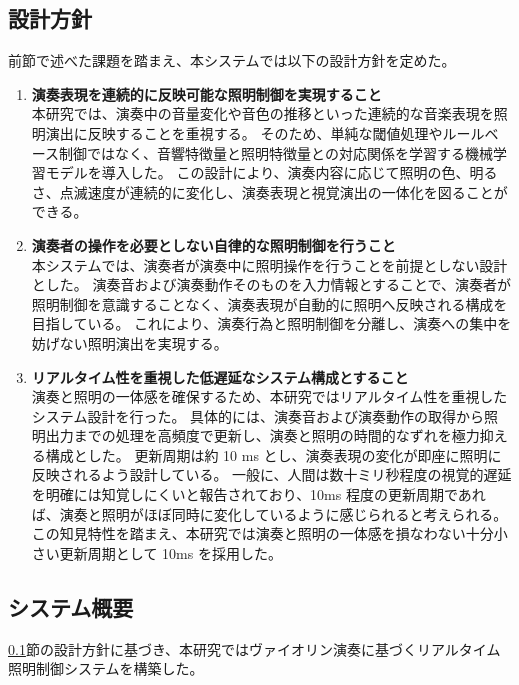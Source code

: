 \subsection{設計方針} \label{sec:design-policy}

前節で述べた課題を踏まえ、本システムでは以下の設計方針を定めた。

\begin{enumerate}
	\item \textbf{演奏表現を連続的に反映可能な照明制御を実現すること}　\\
	    本研究では、演奏中の音量変化や音色の推移といった連続的な音楽表現を照明演出に反映することを重視する。
		そのため、単純な閾値処理やルールベース制御ではなく、音響特徴量と照明特徴量との対応関係を学習する機械学習モデルを導入した。
		この設計により、演奏内容に応じて照明の色、明るさ、点滅速度が連続的に変化し、演奏表現と視覚演出の一体化を図ることができる。
	\item \textbf{演奏者の操作を必要としない自律的な照明制御を行うこと}　\\
	    本システムでは、演奏者が演奏中に照明操作を行うことを前提としない設計とした。
		演奏音および演奏動作そのものを入力情報とすることで、演奏者が照明制御を意識することなく、演奏表現が自動的に照明へ反映される構成を目指している。
		これにより、演奏行為と照明制御を分離し、演奏への集中を妨げない照明演出を実現する。
	\item \textbf{リアルタイム性を重視した低遅延なシステム構成とすること}　\\
	    演奏と照明の一体感を確保するため、本研究ではリアルタイム性を重視したシステム設計を行った。
		具体的には、演奏音および演奏動作の取得から照明出力までの処理を高頻度で更新し、演奏と照明の時間的なずれを極力抑える構成とした。
		更新周期は約 10 ms とし、演奏表現の変化が即座に照明に反映されるよう設計している。
		一般に、人間は数十ミリ秒程度の視覚的遅延を明確には知覚しにくいと報告されており\cite{Kadowaki19}、10ms 程度の更新周期であれば、演奏と照明がほぼ同時に変化しているように感じられると考えられる。
		この知見特性を踏まえ、本研究では演奏と照明の一体感を損なわない十分小さい更新周期として 10ms を採用した。
\end{enumerate}

\subsection{システム概要}

\ref{sec:design-policy}節の設計方針に基づき、本研究ではヴァイオリン演奏に基づくリアルタイム照明制御システムを構築した。

